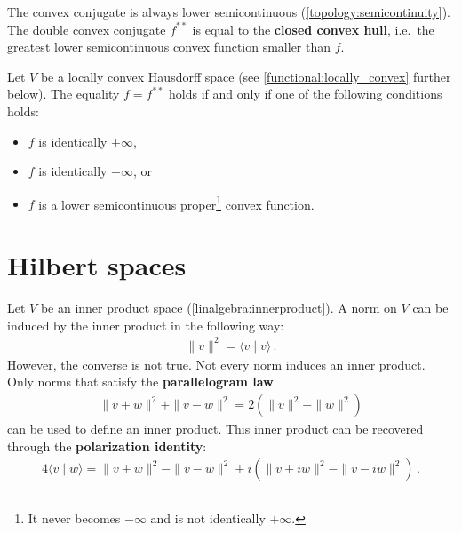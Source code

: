     \begin{property}
        The convex conjugate is always lower semicontinuous (\cref{topology:semicontinuity}). The double convex conjugate $f^{**}$ is equal to the \textbf{closed convex hull}, i.e.~the greatest lower semicontinuous convex function smaller than $f$.
    \end{property}

    \begin{theorem}
        Let $V$ be a locally convex Hausdorff space (see \cref{functional:locally_convex} further below). The equality $f=f^{**}$ holds if and only if one of the following conditions holds:
        \begin{itemize}
            \item $f$ is identically $+\infty$,
            \item $f$ is identically $-\infty$, or
            \item $f$ is a lower semicontinuous proper\footnote{It never becomes $-\infty$ and is not identically $+\infty$.} convex function.
        \end{itemize}
    \end{theorem}

\section{Hilbert spaces}

    \begin{remark}
        Let $V$ be an inner product space (\cref{linalgebra:innerproduct}). A norm on $V$ can be induced by the inner product in the following way:
        \begin{gather}
            \label{functional:inner_product_norm}
            \|v\|^2 = \langle v\mid v \rangle\,.
        \end{gather}
        However, the converse is not true. Not every norm induces an inner product. Only norms that satisfy the \textbf{parallelogram law}
        \begin{gather}
            \label{functional:parallellogram_law}
            \|v+w\|^2 + \|v-w\|^2 = 2(\|v\|^2 + \|w\|^2)
        \end{gather}
        can be used to define an inner product. This inner product can be recovered through the \textbf{polarization identity}:
        \begin{gather}
            \label{functional:polarization_identity}
            4\langle v\mid w \rangle = \|v+w\|^2 - \|v-w\|^2 + i\left(\|v+iw\|^2 - \|v-iw\|^2\right)\,.
        \end{gather}
    \end{remark}

